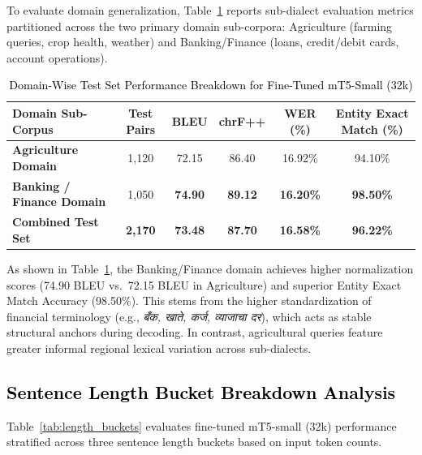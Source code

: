 To evaluate domain generalization, Table~\ref{tab:domain_breakdown} reports sub-dialect evaluation metrics partitioned across the two primary domain sub-corpora: Agriculture (farming queries, crop health, weather) and Banking/Finance (loans, credit/debit cards, account operations).

\begin{table}[t]
\color{black}
\centering
\caption{\textcolor{black}{Domain-Wise Test Set Performance Breakdown for Fine-Tuned mT5-Small (32k)}}
\label{tab:domain_breakdown}
\begin{tabularx}{\textwidth}{lccccc}
\hline
\textbf{Domain Sub-Corpus} & \textbf{Test Pairs} & \textbf{BLEU} & \textbf{chrF++} & \textbf{WER (\%)} & \textbf{Entity Exact Match (\%)} \\
\hline
\textbf{Agriculture Domain} & 1,120 & 72.15 & 86.40 & 16.92\% & 94.10\% \\
\textbf{Banking / Finance Domain} & 1,050 & \textbf{74.90} & \textbf{89.12} & \textbf{16.20\%} & \textbf{98.50\%} \\
\hline
\textbf{Combined Test Set} & \textbf{2,170} & \textbf{73.48} & \textbf{87.70} & \textbf{16.58\%} & \textbf{96.22\%} \\
\hline
\end{tabularx}
\end{table}

As shown in Table~\ref{tab:domain_breakdown}, the Banking/Finance domain achieves higher normalization scores (74.90 BLEU vs.\ 72.15 BLEU in Agriculture) and superior Entity Exact Match Accuracy (98.50\%). This stems from the higher standardization of financial terminology (e.g., \emph{बँक, खाते, कर्ज, व्याजाचा दर}), which acts as stable structural anchors during decoding. In contrast, agricultural queries feature greater informal regional lexical variation across sub-dialects.

\subsection{\textcolor{black}{Sentence Length Bucket Breakdown Analysis}}

Table~\ref{tab:length_buckets} evaluates fine-tuned mT5-small (32k) performance stratified across three sentence length buckets based on input token counts.

